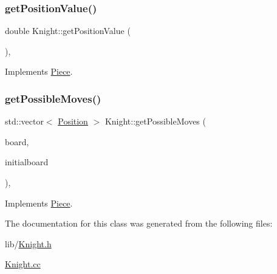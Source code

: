 \subsubsection{\texorpdfstring{get\+Position\+Value()}{getPositionValue()}}
{\footnotesize\ttfamily double Knight\+::get\+Position\+Value (\begin{DoxyParamCaption}{ }\end{DoxyParamCaption})\hspace{0.3cm}{\ttfamily [override]}, {\ttfamily [virtual]}}



Implements \hyperlink{class_piece_a4adfa58b4f0368c9a5859afcf294e0a4}{Piece}.

\mbox{\label{class_knight_a1b8ea442283ed12951dfb67d7382221d}} 
\subsubsection{\texorpdfstring{get\+Possible\+Moves()}{getPossibleMoves()}}
{\footnotesize\ttfamily std\+::vector$<$ \hyperlink{struct_position}{Position} $>$ Knight\+::get\+Possible\+Moves (\begin{DoxyParamCaption}\item[{std\+::shared\+\_\+ptr$<$ \hyperlink{class_base_board}{Base\+Board} $>$}]{board,  }\item[{bool}]{initialboard }\end{DoxyParamCaption})\hspace{0.3cm}{\ttfamily [override]}, {\ttfamily [virtual]}}



Implements \hyperlink{class_piece_a8891924c280568529878549f59541925}{Piece}.



The documentation for this class was generated from the following files\+:\begin{DoxyCompactItemize}
\item 
lib/\hyperlink{_knight_8h}{Knight.\+h}\item 
\hyperlink{_knight_8cc}{Knight.\+cc}\end{DoxyCompactItemize}

